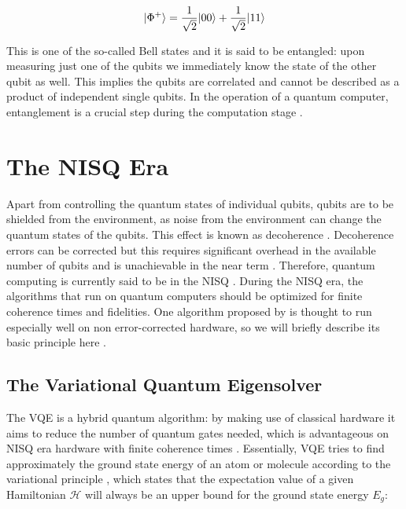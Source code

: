 \begin{equation}\label{eq:Entangled}
	\lvert\Phi^+\rangle = \frac{1}{\sqrt{2}} \lvert00\rangle+ \frac{1}{\sqrt{2}} \lvert11\rangle
\end{equation}

This is one of the so-called Bell states \cite{Nielsen2011} and it is said to be entangled: upon measuring just one of the qubits we immediately know the state of the other qubit as well.
This implies the qubits are correlated and cannot be described as a product of independent single qubits.
In the operation of a quantum computer, entanglement is a crucial step during the computation stage \cite{Henriet2020}. 

\section{The NISQ Era}

Apart from controlling the quantum states of individual qubits, qubits are to be shielded from the environment, as noise from the environment can change the quantum states of the qubits. 
This effect is known as decoherence \cite{DiVincenzo2000}. Decoherence errors can be corrected but this requires significant overhead in the available number of qubits and is unachievable in the near term \cite{Peres1985,Ladd2010}. 
Therefore, quantum computing is currently said to be in the \ac{NISQ} \cite{Preskill2018}.
During the \ac{NISQ} era, the algorithms that run on quantum computers should be optimized for finite coherence times and fidelities. 
One algorithm proposed by \cite{Peruzzo2014} is thought to run especially well on non error-corrected hardware, so we will briefly describe its basic principle here \cite{McClean2016}. 

\subsection{The Variational Quantum Eigensolver}

The \ac{VQE} is a hybrid quantum algorithm: by making use of classical hardware it aims to reduce the number of quantum gates needed, which is advantageous on NISQ era hardware with finite coherence times \cite{McClean2016}. 
Essentially, \ac{VQE} tries to find approximately the ground state energy of an atom or molecule according to the variational principle \cite{Griffiths2004}, which states that the expectation value of a given Hamiltonian $\mathcal{H}$ will always be an upper bound for the ground state energy $E_g$:

